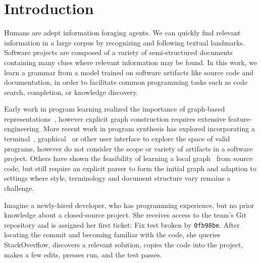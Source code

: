 \documentclass[sigconf]{acmart}
\begin{document}
  \section{Introduction}\label{sec:introduction}

  Humans are adept information foraging agents. We can quickly find relevant information in a large corpus by recognizing and following textual landmarks. Software projects are composed of a variety of semi-structured documents containing many clues where relevant information may be found. In this work, we learn a grammar from a model trained on software artifacts like source code and documentation, in order to facilitate common programming tasks such as code search, completion, or knowledge discovery.


  Early work in program learning realized the importance of graph-based representations~\citep{allamanis2017learning}, however explicit graph construction requires extensive feature-engineering. More recent work in program synthesis has explored incorporating a terminal~\citep{ellis2019write}, graphical~\citep{walke2020learning} or other user interface to explore the space of valid programs, however do not consider the scope or variety of artifacts in a software project. Others have shown the feasibility of learning a local graph~\citep{johnson2020learning} from source code, but still require an explicit parser to form the initial graph and adaption to settings where style, terminology and document structure vary remains a challenge.


  Imagine a newly-hired developer, who has programming experience, but no prior knowledge about a closed-source project. She receives access to the team's Git repository and is assigned her first ticket: Fix test broken by \texttt{0fb98be}. After locating the commit and becoming familiar with the code, she queries StackOverflow, discovers a relevant solution, copies the code into the project, makes a few edits, presses run, and the test passes.
\end{document}
